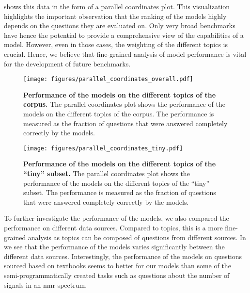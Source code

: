  shows this data in the form of a parallel coordinates plot. 
This visualization highlights the important observation that the ranking of the models highly depends on the questions they are evaluated on.
Only very broad benchmarks have hence the potential to provide a comprehensive view of the capabilities of a model. However, even in those cases, the weighting of the different topics is crucial.
Hence, we believe that fine-grained analysis of model performance is vital for the development of future benchmarks.

\begin{figure}[htb]
    \centering
    \texttt{[image: figures/parallel\_coordinates\_overall.pdf]}
    \caption{\textbf{Performance of the models on the different topics of the \chembench corpus.} The parallel coordinates plot shows the performance of the models on the different topics of the \chembench corpus. The performance is measured as the fraction of questions that were answered completely correctly by the models. }
    \label{fig:parallel_coordinates_overall}
\end{figure}

\begin{figure}[htb]
    \centering
    \texttt{[image: figures/parallel\_coordinates\_tiny.pdf]}
    \caption{\textbf{Performance of the models on the different topics of the \enquote{tiny} subset.} The parallel coordinates plot shows the performance of the models on the different topics of the \enquote{tiny} subset. The performance is measured as the fraction of questions that were answered completely correctly by the models. }
    \label{fig:parallel_coordinates_tiny}
\end{figure}

To further investigate the performance of the models, we also compared the performance on different data sources.
Compared to topics, this is a more fine-grained analysis as topics can be composed of questions from different sources.
In  we see that the performance of the models varies significantly between the different data sources.
Interestingly, the performance of the models on questions sourced based on textbooks seems to better for our models than some of the semi-programmatically created tasks such as questions about the number of signals in an \gls{nmr} spectrum.


